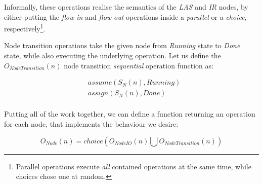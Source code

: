 Informally, these operations realise the semantics of the \emph{LAS} and \emph{IR} nodes, by either putting the \emph{flow in} and \emph{flow out} operations inside a \emph{parallel} or a \emph{choice}, respectively\footnote{Parallel operations execute \emph{all} contained operations at the same time, while choices chose one at random.}.

\begin{definition}
	Node transition operations take the given node from \emph{Running} state to \emph{Done} state, while also executing the underlying operation. Let us define the \(O_\mathit{NodeTransition}(n)\) node transition \emph{sequential} operation function as:
	
	\begin{align*}
		&\mathit{assume}(S_N(n), \mathit{Running}) \\
		&\mathit{assign}(S_N(n), \mathit{Done}) \\
	\end{align*}
\end{definition}

\begin{definition}
	Putting all of the work together, we can define a function returning an operation for each node, that implements the behaviour we desire:
	
	\begin{equation*}
		O_\mathit{Node}(n) = \mathit{choice}(O_\mathit{NodeIO}(n) \bigcup O_\mathit{NodeTransition}(n))
	\end{equation*}
\end{definition}


\iffalse

